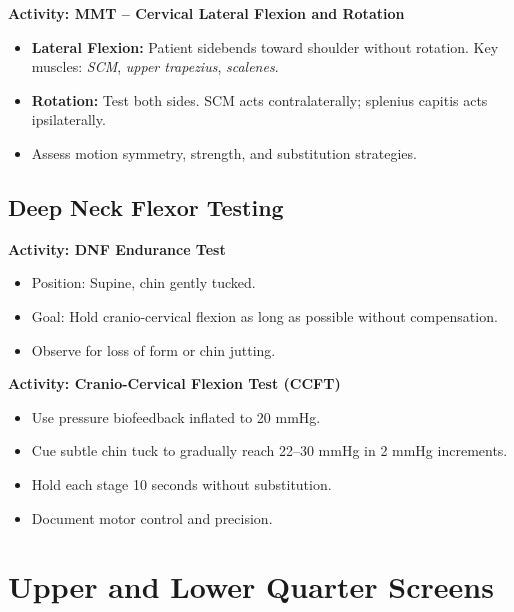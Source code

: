 \begin{labactivitybox}
\textbf{Activity: MMT – Cervical Lateral Flexion and Rotation}

\begin{itemize}
  \item \textbf{Lateral Flexion:} Patient sidebends toward shoulder without rotation. Key muscles: \textit{SCM}, \textit{upper trapezius}, \textit{scalenes}.
  \item \textbf{Rotation:} Test both sides. SCM acts contralaterally; splenius capitis acts ipsilaterally.
  \item Assess motion symmetry, strength, and substitution strategies.
\end{itemize}
\end{labactivitybox}

\subsection*{Deep Neck Flexor Testing}

\begin{labactivitybox}
\textbf{Activity: DNF Endurance Test}

\begin{itemize}
  \item Position: Supine, chin gently tucked.
  \item Goal: Hold cranio-cervical flexion as long as possible without compensation.
  \item Observe for loss of form or chin jutting.
\end{itemize}
\end{labactivitybox}

\begin{labactivitybox}
\textbf{Activity: Cranio-Cervical Flexion Test (CCFT)}

\begin{itemize}
  \item Use pressure biofeedback inflated to 20 mmHg.
  \item Cue subtle chin tuck to gradually reach 22–30 mmHg in 2 mmHg increments.
  \item Hold each stage 10 seconds without substitution.
  \item Document motor control and precision.
\end{itemize}
\end{labactivitybox}




\section*{Upper and Lower Quarter Screens}

